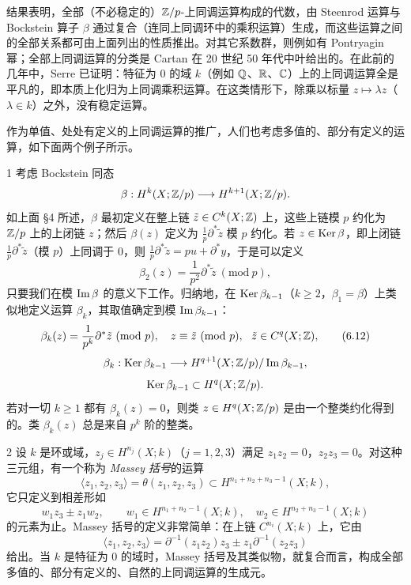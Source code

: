 
结果表明，全部（不必稳定的）$\mathbb{Z}/p$-上同调运算构成的代数，由 Steenrod 运算与 Bockstein 算子 $\beta$ 通过复合（连同上同调环中的乘积运算）生成，而这些运算之间的全部关系都可由上面列出的性质推出。对其它系数群，则例如有 Pontryagin 幂；全部上同调运算的分类是 Cartan 在 20 世纪 50 年代中叶给出的。在此前的几年中，Serre 已证明：特征为 0 的域 $k$（例如 $\mathbb{Q}$、$\mathbb{R}$、$\mathbb{C}$）上的上同调运算全是平凡的，即本质上化归为上同调乘积运算。在这类情形下，除乘以标量 $z\mapsto\lambda z$（$\lambda\in k$）之外，没有稳定运算。

作为单值、处处有定义的上同调运算的推广，人们也考虑多值的、部分有定义的运算，如下面两个例子所示。

\begin{example}{1}
考虑 Bockstein 同态
\[
\beta:H^k(X;\mathbb{Z}/p)\longrightarrow H^{k+1}(X;\mathbb{Z}/p).
\]
如上面 §4 所述，$\beta$ 最初定义在整上链 $\tilde z\in C^k(X;\mathbb{Z})$ 上，这些上链模 $p$ 约化为 $\mathbb{Z}/p$ 上的上闭链 $z$；然后 $\beta(z)$ 定义为 $\frac{1}{p}\partial^*\tilde z$ 模 $p$ 约化。若 $z\in\operatorname{Ker}\beta$，即上闭链 $\frac{1}{p}\partial^*\tilde z$（模 $p$）上同调于 0，则 $\frac{1}{p}\partial^*\tilde z=pu+\partial^*y$，于是可以定义
\[
\beta_2(z)=\frac{1}{p^2}\partial^*\tilde z\ (\mathrm{mod}\ p),
\]
只要我们在模 $\operatorname{Im}\beta$ 的意义下工作。归纳地，在 $\operatorname{Ker}\beta_{k-1}$（$k\ge 2$，$\beta_1=\beta$）上类似地定义运算 $\beta_k$，其取值确定到模 $\operatorname{Im}\beta_{k-1}$：
\begin{equation}
\beta_k(z)=\frac{1}{p^k}\partial^*\tilde z\ (\mathrm{mod}\ p),\quad z\equiv\tilde z\ (\mathrm{mod}\ p),\ \ \tilde z\in C^q(X;\Z), \tag{6.12}
\end{equation}
\[
\beta_k:\operatorname{Ker}\beta_{k-1}\longrightarrow H^{q+1}(X;\mathbb{Z}/p)/\operatorname{Im}\beta_{k-1},
\]
\[
\operatorname{Ker}\beta_{k-1}\subset H^q(X;\mathbb{Z}/p).
\]
若对一切 $k\ge 1$ 都有 $\beta_k(z)=0$，则类 $z\in H^q(X;\mathbb{Z}/p)$ 是由一个整类约化得到的。类 $\beta_k(z)$ 总是来自 $p^k$ 阶的整类。
\end{example}

\begin{example}{2}
设 $k$ 是环或域，$z_j\in H^{n_j}(X;k)$（$j=1,2,3$）满足 $z_1z_2=0$，$z_2z_3=0$。对这种三元组，有一个称为 \emph{Massey 括号}的运算
\begin{equation}
\langle z_1,z_2,z_3\rangle=\theta(z_1,z_2,z_3)\subset H^{n_1+n_2+n_3-1}(X;k), \tag{6.13}
\end{equation}
它只定义到相差形如
\[
w_1z_3\pm z_1w_2,\qquad w_1\in H^{n_1+n_2-1}(X;k),\quad w_2\in H^{n_2+n_3-1}(X;k)
\]
的元素为止。Massey 括号的定义非常简单：在上链 $C^{n_i}(X;k)$ 上，它由
\[
\langle z_1,z_2,z_3\rangle=\partial^{-1}(z_1z_2)z_3\pm z_1\partial^{-1}(z_2z_3)
\]
给出。当 $k$ 是特征为 0 的域时，Massey 括号及其类似物，就复合而言，构成全部多值的、部分有定义的、自然的上同调运算的生成元。
\end{example}

